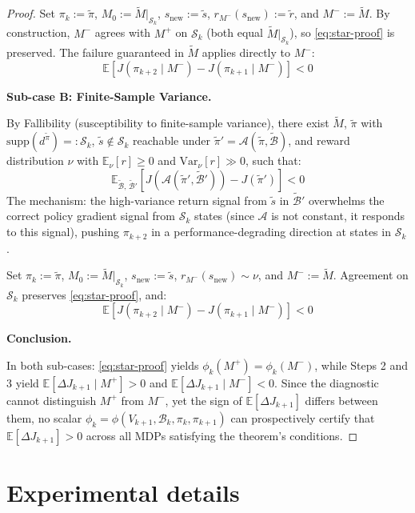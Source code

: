 \documentclass{article}
\begin{document}
\begin{proof}
Set $\pi_k := \tilde{\pi}$, $M_0 := \widetilde{M}\big|_{\mathcal{S}_k}$, $s_{\text{new}} := \tilde{s}$, $r_{M^-}(s_{\text{new}}) := \tilde{r}$, and $M^- := \widetilde{M}$. By construction, $M^-$ agrees with $M^+$ on $\mathcal{S}_k$ (both equal $\widetilde{M}|_{\mathcal{S}_k}$), so \eqref{eq:star-proof} is preserved. The failure guaranteed in $\widetilde{M}$ applies directly to $M^-$:
\[
\mathbb{E}\!\left[J(\pi_{k+2} \mid M^-) - J(\pi_{k+1} \mid M^-)\right] < 0
\]

\textbf{Sub-case B: Finite-Sample Variance.}

By Fallibility (susceptibility to finite-sample variance), there exist $\widetilde{M}$, $\tilde{\pi}$ with $\text{supp}(d^{\tilde{\pi}}) =: \mathcal{S}_k$, $\tilde{s} \notin \mathcal{S}_k$ reachable under $\tilde{\pi}' = \mathcal{A}(\tilde{\pi}, \widetilde{\mathcal{B}})$, and reward distribution $\nu$ with $\mathbb{E}_\nu[r] \geq 0$ and $\text{Var}_\nu[r] \gg 0$, such that:
\[
\mathbb{E}_{\widetilde{\mathcal{B}},\, \widetilde{\mathcal{B}}'}\!\left[J\!\left(\mathcal{A}(\tilde{\pi}', \widetilde{\mathcal{B}}')\right) - J(\tilde{\pi}')\right] < 0
\]
The mechanism: the high-variance return signal from $\tilde{s}$ in $\widetilde{\mathcal{B}}'$ overwhelms the correct policy gradient signal from $\mathcal{S}_k$ states (since $\mathcal{A}$ is not constant, it responds to this signal), pushing $\pi_{k+2}$ in a performance-degrading direction at states in $\mathcal{S}_k$.

Set $\pi_k := \tilde{\pi}$, $M_0 := \widetilde{M}\big|_{\mathcal{S}_k}$, $s_{\text{new}} := \tilde{s}$, $r_{M^-}(s_{\text{new}}) \sim \nu$, and $M^- := \widetilde{M}$. Agreement on $\mathcal{S}_k$ preserves \eqref{eq:star-proof}, and:
\[
\mathbb{E}\!\left[J(\pi_{k+2} \mid M^-) - J(\pi_{k+1} \mid M^-)\right] < 0
\]

\textbf{Conclusion.}

In both sub-cases: \eqref{eq:star-proof} yields $\phi_k(M^+) = \phi_k(M^-)$, while Steps 2 and 3 yield $\mathbb{E}[\Delta J_{k+1} \mid M^+] > 0$ and $\mathbb{E}[\Delta J_{k+1} \mid M^-] < 0$. Since the diagnostic cannot distinguish $M^+$ from $M^-$, yet the sign of $\mathbb{E}[\Delta J_{k+1}]$ differs between them, no scalar $\phi_k = \phi(V_{k+1}, \mathcal{B}_k, \pi_k, \pi_{k+1})$ can prospectively certify that $\mathbb{E}[\Delta J_{k+1}] > 0$ across all MDPs satisfying the theorem's conditions.
\end{proof}

\section{Experimental details}
\label{app:experiments}
\end{document}
